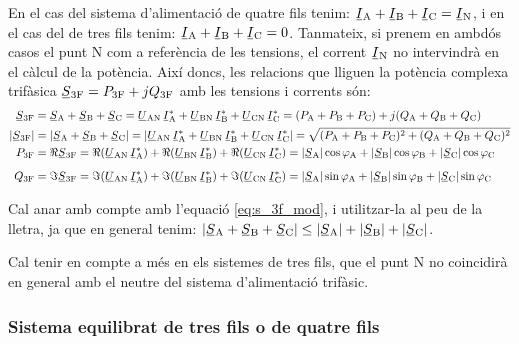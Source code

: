 En el cas del sistema d'alimentació de quatre fils tenim:
$\cmplx{I}\ped{A}+\cmplx{I}\ped{B}+\cmplx{I}\ped{C}=\cmplx{I}\ped{N}$, i
en el cas del de tres fils tenim:
$\cmplx{I}\ped{A}+\cmplx{I}\ped{B}+\cmplx{I}\ped{C}=0$. Tanmateix,
si prenem en ambdós casos el punt N com a referència de les
tensions, el corrent $\cmplx{I}\ped{N}$ no intervindrà en el càlcul de
la potència. Així doncs, les relacions que lliguen la potència
complexa trifàsica $\cmplx{S}\ped{3F} = P\ped{3F} + j Q\ped{3F}$
amb les tensions i corrents són:
\begin{align}
    \cmplx{S}\ped{3F} &= \cmplx{S}\ped{A} + \cmplx{S}\ped{B} + \cmplx{S}\ped{C} =
     \cmplx{U}\ped{AN}\, \cmplx{I}\ped{A}^* +
    \cmplx{U}\ped{BN} \,\cmplx{I}\ped{B}^* +  \cmplx{U}\ped{CN}\, \cmplx{I}\ped{C}^* =
    (P\ped{A} + P\ped{B} + P\ped{C}) + j (Q\ped{A} + Q\ped{B} + Q\ped{C}) \label{eq:s_3f} \\
    |\cmplx{S}\ped{3F}| &= |\cmplx{S}\ped{A} + \cmplx{S}\ped{B} + \cmplx{S}\ped{C}| =
    |\cmplx{U}\ped{AN}\, \cmplx{I}\ped{A}^* +
    \cmplx{U}\ped{BN} \,\cmplx{I}\ped{B}^* +  \cmplx{U}\ped{CN}\, \cmplx{I}\ped{C}^*| =
    \sqrt{(P\ped{A} + P\ped{B} + P\ped{C})^2 + (Q\ped{A} + Q\ped{B} + Q\ped{C})^2} \label{eq:s_3f_mod} \\
    P\ped{3F} &= \Re\cmplx{S}\ped{3F} = \Re(\cmplx{U}\ped{AN} \,\cmplx{I}\ped{A}^*) +
    \Re(\cmplx{U}\ped{BN} \,\cmplx{I}\ped{B}^*) +  \Re(\cmplx{U}\ped{CN}\,
    \cmplx{I}\ped{C}^*) = |\cmplx{S}\ped{A}| \cos \varphi\ped{A} + |\cmplx{S}\ped{B}| \cos
    \varphi\ped{B} + |\cmplx{S}\ped{C}| \cos \varphi\ped{C} \\[2mm]
    Q\ped{3F} &= \Im\cmplx{S}\ped{3F} = \Im(\cmplx{U}\ped{AN} \,\cmplx{I}\ped{A}^*) +
    \Im(\cmplx{U}\ped{BN} \,\cmplx{I}\ped{B}^*) +  \Im(\cmplx{U}\ped{CN}\,
    \cmplx{I}\ped{C}^*) = |\cmplx{S}\ped{A}| \sin \varphi\ped{A} + |\cmplx{S}\ped{B}| \sin
    \varphi\ped{B} + |\cmplx{S}\ped{C}| \sin \varphi\ped{C}
\end{align}

Cal anar amb compte amb l'equació \eqref{eq:s_3f_mod}, i utilitzar-la al
peu de la lletra, ja
que en general tenim: $|\cmplx{S}\ped{A} + \cmplx{S}\ped{B} + \cmplx{S}\ped{C}| \leq
|\cmplx{S}\ped{A}| + |\cmplx{S}\ped{B}| + |\cmplx{S}\ped{C}|$.

Cal tenir en compte a més en els sistemes de tres fils, que el punt
N no coincidirà en general amb el neutre del sistema
d'alimentació trifàsic.

\subsubsection{Sistema equilibrat de tres fils o de quatre fils}

